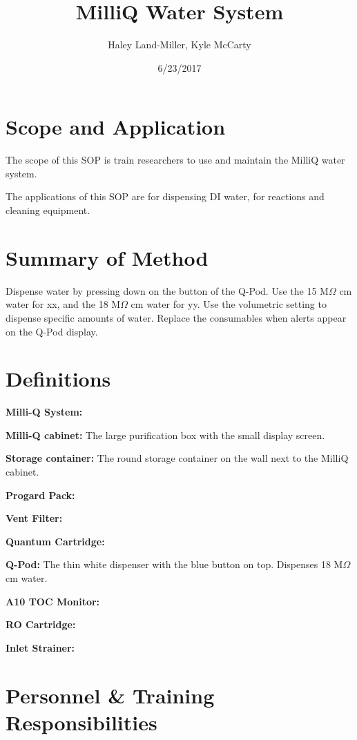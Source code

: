 \documentclass[12pt]{../SOP3_beta}\usepackage[]{graphicx}\usepackage[]{color}
\title{MilliQ Water System}
\date{6/23/2017}
\author{Haley Land-Miller, Kyle McCarty}
\begin{document}
\maketitle

\section{Scope and Application}

\NP The scope of this SOP is train researchers to use and maintain the MilliQ water system.

\NP The applications of this SOP are for dispensing DI water, for reactions and cleaning equipment. 

\section{Summary of Method}

\NP Dispense water by pressing down on the button of the Q-Pod. Use the 15 M$\Omega$ cm water for xx, and the 18 M$\Omega$ cm water for yy. Use the volumetric setting to dispense specific amounts of water. Replace the consumables when alerts appear on the Q-Pod display. 

\tableofcontents

\newpage

\section{Definitions}

\NP \textbf{Milli-Q System:}

\NP \textbf{Milli-Q cabinet:} The large purification box with the small display screen.

\NP \textbf{Storage container:} The round storage container on the wall next to the MilliQ cabinet.

\NP \textbf{Progard Pack:}

\NP \textbf{Vent Filter:}

\NP \textbf{Quantum Cartridge:}

\NP \textbf{Q-Pod:} The thin white dispenser with the blue button on top. Dispenses 18 M$\Omega$ cm water.

\NP \textbf{A10 TOC Monitor:}

\NP \textbf{RO Cartridge:}

\NP \textbf{Inlet Strainer:}

\section{Personnel \& Training Responsibilities}
\end{document}
